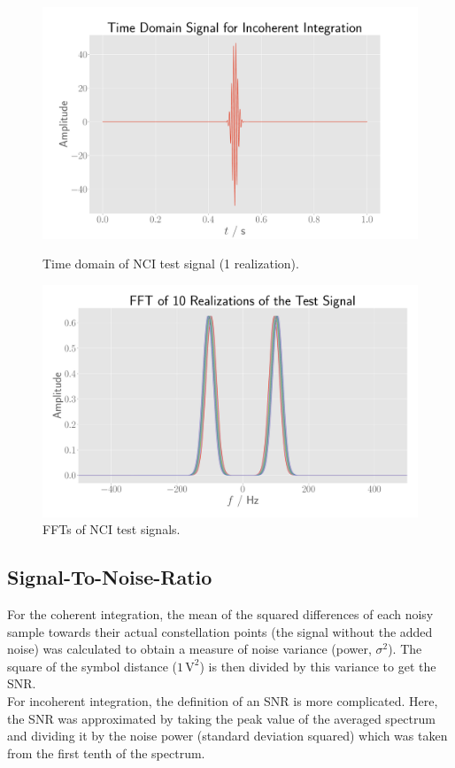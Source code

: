 \begin{figure}
    \centering
    \begin{minipage}{0.5\textwidth}
        \centering
        \includegraphics[width=1\textwidth]{graphics/nci_time.pdf} %
        \caption{Time domain of NCI test signal (1 realization).}\label{fig:nci_signal}
    \end{minipage}\hfill
    \begin{minipage}{0.5\textwidth}
        \centering
        \includegraphics[width=1\textwidth]{graphics/nci_spec.pdf} %
        \caption{FFTs of NCI test signals.}\label{fig:nci_signal_spec}
    \end{minipage}
\end{figure}

\subsection{Signal-To-Noise-Ratio}

For the coherent integration, the mean of the squared differences of each noisy sample towards their actual constellation points (the signal without the added noise) was calculated to obtain a measure of noise variance (power, $\sigma^{2}$). The square of the symbol distance ($1\,\si{\volt\squared}$) is then divided by this variance to get the SNR.\\

For incoherent integration, the definition of an SNR is more complicated. \cite{richards_pdf} Here, the SNR was approximated by taking the peak value of the averaged spectrum and dividing it by the noise power (standard deviation squared) which was taken from the first tenth of the spectrum.
